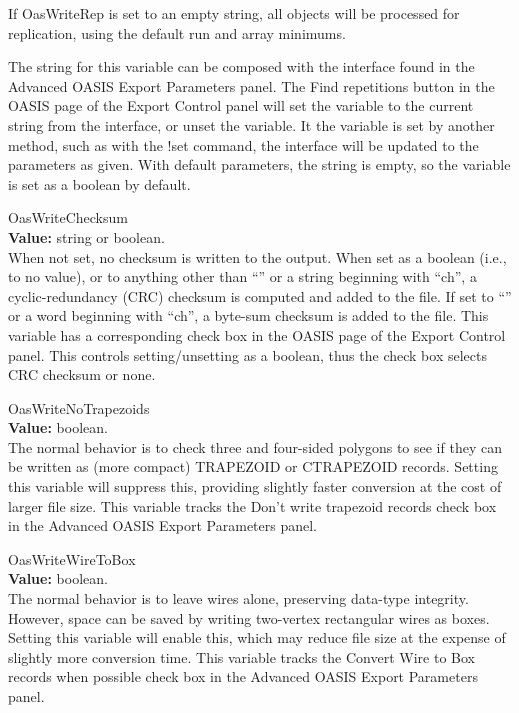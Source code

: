 \begin{description}
If {\et OasWriteRep} is set to an empty string, all objects will be
processed for replication, using the default run and array minimums.

The string for this variable can be composed with the interface found
in the {\cb Advanced OASIS Export Parameters} panel.  The {\cb Find
repetitions} button in the {\cb OASIS} page of the {\cb Export
Control} panel will set the variable to the current string from the
interface, or unset the variable.  It the variable is set by another
method, such as with the {\cb !set} command, the interface will be
updated to the parameters as given.  With default parameters, the
string is empty, so the variable is set as a boolean by default.

\label{OasWriteChecksum}
\item{\et OasWriteChecksum}\\
{\bf Value:} string or boolean.\\
When not set, no checksum is written to the output.  When set as a
boolean (i.e., to no value), or to anything other than ``{}'' or
a string beginning with ``{\vt ch}'', a cyclic-redundancy (CRC)
checksum is computed and added to the file.  If set to ``{}'' or
a word beginning with ``{\vt ch}'', a byte-sum checksum is added to
the file.  This variable has a corresponding check box in the {\cb
OASIS} page of the {\cb Export Control} panel.  This controls
setting/unsetting as a boolean, thus the check box selects CRC
checksum or none.

\item{\et OasWriteNoTrapezoids}\\
{\bf Value:} boolean.\\
The normal behavior is to check three and four-sided polygons to see
if they can be written as (more compact) TRAPEZOID or CTRAPEZOID
records.  Setting this variable will suppress this, providing slightly
faster conversion at the cost of larger file size.  This variable
tracks the {\cb Don't write trapezoid records} check box in the {\cb
Advanced OASIS Export Parameters} panel.

\item{\et OasWriteWireToBox}\\
{\bf Value:} boolean.\\
The normal behavior is to leave wires alone, preserving data-type
integrity.  However, space can be saved by writing two-vertex
rectangular wires as boxes.  Setting this variable will enable this,
which may reduce file size at the expense of slightly more conversion
time.  This variable tracks the {\cb Convert Wire to Box records when
possible} check box in the {\cb Advanced OASIS Export Parameters}
panel.


\end{description}
